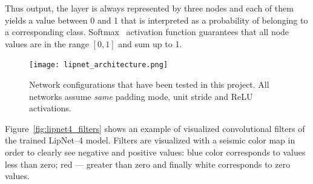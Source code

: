 \documentclass[a4paper, 11pt, table]{article}
\begin{document}
Thus output, the layer is always represented by three nodes and each of them yields a value between 0 and 1 that is interpreted as a probability of belonging to a corresponding class. Softmax~\cite{Bishop:2006:PRM:1162264} activation function guarantees that all node values are in the range $[0, 1]$ and sum up to 1. 

\begin{figure}[H]
\centering
\texttt{[image: lipnet\_architecture.png]} 
\caption{Network configurations that have been tested in this project. All networks assume \textit{same} padding mode, unit stride and ReLU activations.}
\label{fig:lipnet_arch}
\end{figure}

Figure~\ref{fig:lipnet4_filters} shows an example of visualized convolutional filters of the trained LipNet--4 model. Filters are visualized with a seismic color map in order to clearly see negative and positive values: blue color corresponds to values less than zero; red --- greater than zero and finally white corresponds to zero values. 
\end{document}

